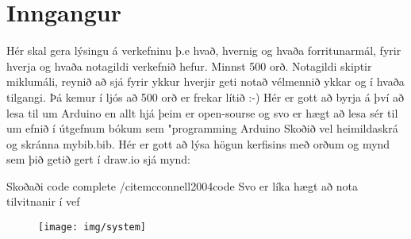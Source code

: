\section{Inngangur}
Hér skal gera lýsingu á verkefninu þ.e hvað,  hvernig og  hvaða forritunarmál, fyrir hverja og hvaða notagildi verkefnið hefur. Minnst 500 orð. Notagildi skiptir miklumáli, reynið að sjá fyrir ykkur hverjir geti notað vélmennið ykkar og í hvaða tilgangi.  Þá kemur í ljós að 500 orð er frekar lítið :-) Hér er gott að byrja á því að lesa til um Arduino en allt hjá þeim er open-sourse og svo er hægt að lesa sér til um efnið í útgefnum bókum sem "programming Arduino \cite{monk} Skoðið vel heimildaskrá og skránna mybib.bib. Hér er gott að lýsa högun kerfisins með orðum og mynd sem þið getið gert í draw.io sjá mynd: 

Skoðaði code complete /cite{mcconnell2004code}
Svo er líka hægt að nota tilvitnanir í vef \cite{WinNT}
\begin{figure}[h]
\texttt{[image: img/system]}
\end{figure}